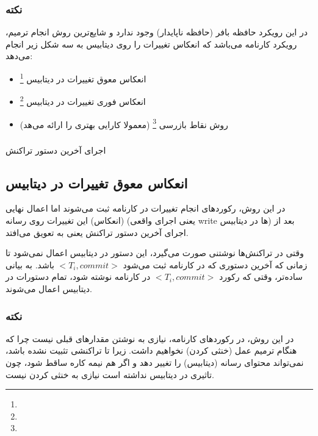 \subsubsection*{نکته}

در این رویکرد حافظه بافر (حافظه ناپایدار) وجود ندارد و شایع‌ترین روش انجام
ترمیم، رویکرد کارنامه می‌باشد که انعکاس تغییرات را روی دیتابیس به سه شکل زیر
انجام می‌دهد:

\begin{itemize}
    \item انعکاس معوق تغییرات در دیتابیس \footnote{}
    \item انعکاس فوری تغییرات در دیتابیس \footnote{}
    \item روش نقاط بازرسی \footnote{} (معمولا کارایی بهتری را
    ارائه می‌هد)
\end{itemize}

\subsubsection{}

اجرای آخرین دستور تراکنش

\subsection{انعکاس معوق تغییرات در دیتابیس}

در این روش، رکورد‌های انجام تغییرات در کارنامه ثبت می‌شوند اما اعمال نهایی
(انعکاس) این تغییرات روی رسانه (یعنی اجرای واقعی write ها در دیتابیس) بعد از
اجرای آخرین دستور تراکنش یعنی  به تعویق می‌افتد.

وقتی در تراکنش‌ها نوشتنی صورت می‌گیرد، این دستور در دیتابیس اعمال نمی‌شود تا
زمانی که آخرین دستوری که در کارنامه ثبت می‌شود $<T_i, commit>$ باشد. به بیانی
ساده‌تر، وقتی که رکورد $<T_i, commit>$ در کارنامه نوشته شود، تمام دستورات
 در دیتابیس اعمال می‌شوند.

\subsubsection*{نکته}

در این روش، در رکورد‌های کارنامه، نیازی به نوشتن مقدار‌های قبلی نیست چرا که
هنگام ترمیم عمل  (خنثی کردن) نخواهیم داشت. زیرا تا تراکنشی تثبیت نشده
باشد، نمی‌تواند محتوای رسانه (دیتابیس) را تغییر دهد و اگر هم نیمه کاره ساقط شود،
چون تاثیری در دیتابیس نداشته است نیازی به خنثی کردن نیست.


